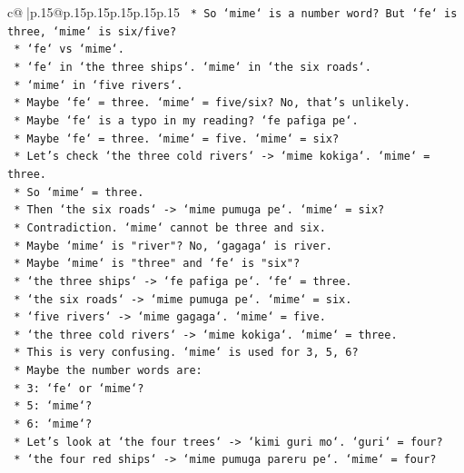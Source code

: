 \documentclass{article}
\begin{document}
{\begin{supertabular}{c@{$\;$}|p{.15\linewidth}@{}p{.15\linewidth}p{.15\linewidth}p{.15\linewidth}p{.15\linewidth}p{.15\linewidth}}
{{{\texttt{            *   So `mime` is a number word? But `fe` is three, `mime` is six/five?} \\
\texttt{            *   `fe` vs `mime`.} \\
\texttt{            *   `fe` in `the three ships`. `mime` in `the six roads`.} \\
\texttt{            *   `mime` in `five rivers`.} \\
\texttt{            *   Maybe `fe` = three. `mime` = five/six? No, that's unlikely.} \\
\texttt{            *   Maybe `fe` is a typo in my reading? `fe pafiga pe`.} \\
\texttt{            *   Maybe `fe` = three. `mime` = five. `mime` = six?} \\
\texttt{            *   Let's check `the three cold rivers` {-}> `mime kokiga`. `mime` = three.} \\
\texttt{            *   So `mime` = three.} \\
\texttt{            *   Then `the six roads` {-}> `mime pumuga pe`. `mime` = six?} \\
\texttt{            *   Contradiction. `mime` cannot be three and six.} \\
\texttt{            *   Maybe `mime` is "river"? No, `gagaga` is river.} \\
\texttt{            *   Maybe `mime` is "three" and `fe` is "six"?} \\
\texttt{            *   `the three ships` {-}> `fe pafiga pe`. `fe` = three.} \\
\texttt{            *   `the six roads` {-}> `mime pumuga pe`. `mime` = six.} \\
\texttt{            *   `five rivers` {-}> `mime gagaga`. `mime` = five.} \\
\texttt{            *   `the three cold rivers` {-}> `mime kokiga`. `mime` = three.} \\
\texttt{            *   This is very confusing. `mime` is used for 3, 5, 6?} \\
\texttt{            *   Maybe the number words are:} \\
\texttt{                *   3: `fe` or `mime`?} \\
\texttt{                *   5: `mime`?} \\
\texttt{                *   6: `mime`?} \\
\texttt{            *   Let's look at `the four trees` {-}> `kimi guri mo`. `guri` = four?} \\
\texttt{            *   `the four red ships` {-}> `mime pumuga pareru pe`. `mime` = four?} \\
}}}
\end{supertabular}}
\end{document}
